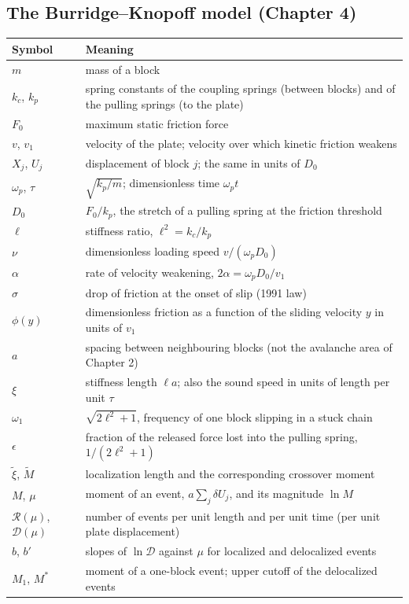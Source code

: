 \subsection*{The Burridge--Knopoff model (Chapter 4)}
\begin{longtable}{@{}p{22mm}p{120mm}@{}}
\toprule
Symbol & Meaning \\
\midrule
$m$ & mass of a block \\
$k_c$, $k_p$ & spring constants of the coupling springs (between blocks) and of the pulling springs (to the plate) \\
$F_0$ & maximum static friction force \\
$v$, $v_1$ & velocity of the plate; velocity over which kinetic friction weakens \\
$X_j$, $U_j$ & displacement of block $j$; the same in units of $D_0$ \\
$\omega_p$, $\tau$ & $\sqrt{k_p/m}$; dimensionless time $\omega_pt$ \\
$D_0$ & $F_0/k_p$, the stretch of a pulling spring at the friction threshold \\
$\ell$ & stiffness ratio, $\ell^2=k_c/k_p$ \\
$\nu$ & dimensionless loading speed $v/(\omega_pD_0)$ \\
$\alpha$ & rate of velocity weakening, $2\alpha=\omega_pD_0/v_1$ \\
$\sigma$ & drop of friction at the onset of slip (1991 law) \\
$\phi(y)$ & dimensionless friction as a function of the sliding velocity $y$ in units of $v_1$ \\
$a$ & spacing between neighbouring blocks (not the avalanche area of Chapter 2) \\
$\xi$ & stiffness length $\ell a$; also the sound speed in units of length per unit $\tau$ \\
$\omega_1$ & $\sqrt{2\ell^2+1}$, frequency of one block slipping in a stuck chain \\
$\epsilon$ & fraction of the released force lost into the pulling spring, $1/(2\ell^2+1)$ \\
$\tilde\xi$, $\tilde M$ & localization length and the corresponding crossover moment \\
$M$, $\mu$ & moment of an event, $a\sum_j\delta U_j$, and its magnitude $\ln M$ \\
$\mathcal R(\mu)$, $\mathcal D(\mu)$ & number of events per unit length and per unit time (per unit plate displacement) \\
$b$, $b'$ & slopes of $\ln\mathcal D$ against $\mu$ for localized and delocalized events \\
$M_1$, $M^*$ & moment of a one-block event; upper cutoff of the delocalized events \\
\bottomrule
\end{longtable}
